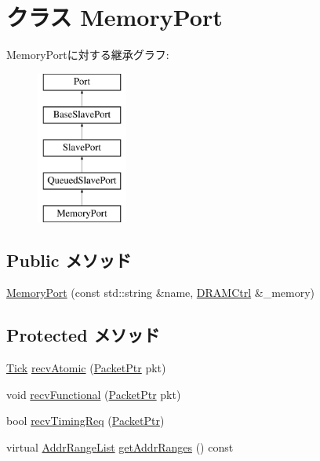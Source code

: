 \hypertarget{classDRAMCtrl_1_1MemoryPort}{
\section{クラス MemoryPort}
\label{classDRAMCtrl_1_1MemoryPort}
}
MemoryPortに対する継承グラフ:\begin{figure}[H]
\begin{center}
\leavevmode
\includegraphics[height=5cm]{classDRAMCtrl_1_1MemoryPort}
\end{center}
\end{figure}
\subsection*{Public メソッド}
\begin{DoxyCompactItemize}
\item 
\hyperlink{classDRAMCtrl_1_1MemoryPort_aee0ee389785135af506951436ea56679}{MemoryPort} (const std::string \&name, \hyperlink{classDRAMCtrl_1_1DRAMCtrl}{DRAMCtrl} \&\_\-memory)
\end{DoxyCompactItemize}
\subsection*{Protected メソッド}
\begin{DoxyCompactItemize}
\item 
\hyperlink{base_2types_8hh_a5c8ed81b7d238c9083e1037ba6d61643}{Tick} \hyperlink{classDRAMCtrl_1_1MemoryPort_a5f0b4c4a94f6b0053f9d7a4eb9c2518a}{recvAtomic} (\hyperlink{classPacket}{PacketPtr} pkt)
\item 
void \hyperlink{classDRAMCtrl_1_1MemoryPort_aeefa907fb6d6a787e6dab90e8138ea90}{recvFunctional} (\hyperlink{classPacket}{PacketPtr} pkt)
\item 
bool \hyperlink{classDRAMCtrl_1_1MemoryPort_a8a15a0ae9c080c5f879fc5e791a9e3e7}{recvTimingReq} (\hyperlink{classPacket}{PacketPtr})
\item 
virtual \hyperlink{classstd_1_1list}{AddrRangeList} \hyperlink{classDRAMCtrl_1_1MemoryPort_a36cf113d5e5e091ebddb32306c098fae}{getAddrRanges} () const 
\end{DoxyCompactItemize}
